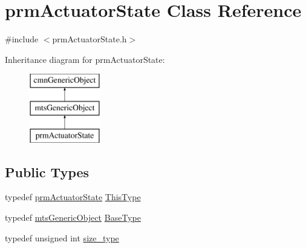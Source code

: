 \hypertarget{classprm_actuator_state}{}\section{prm\+Actuator\+State Class Reference}
\label{classprm_actuator_state}


{\ttfamily \#include $<$prm\+Actuator\+State.\+h$>$}

Inheritance diagram for prm\+Actuator\+State\+:\begin{figure}[H]
\begin{center}
\leavevmode
\includegraphics[height=3.000000cm]{d2/df6/classprm_actuator_state}
\end{center}
\end{figure}
\subsection*{Public Types}
\begin{DoxyCompactItemize}
\item 
typedef \hyperlink{classprm_actuator_state}{prm\+Actuator\+State} \hyperlink{classprm_actuator_state_ac269257fa02fea72e3a2d55526f9a627}{This\+Type}
\item 
typedef \hyperlink{classmts_generic_object}{mts\+Generic\+Object} \hyperlink{classprm_actuator_state_abdc6ad9216ba3ef6720153feeadee054}{Base\+Type}
\item 
typedef unsigned int \hyperlink{classprm_actuator_state_a1ed9ac69482dab8ddf628b1858c42631}{size\+\_\+type}
\end{DoxyCompactItemize}
